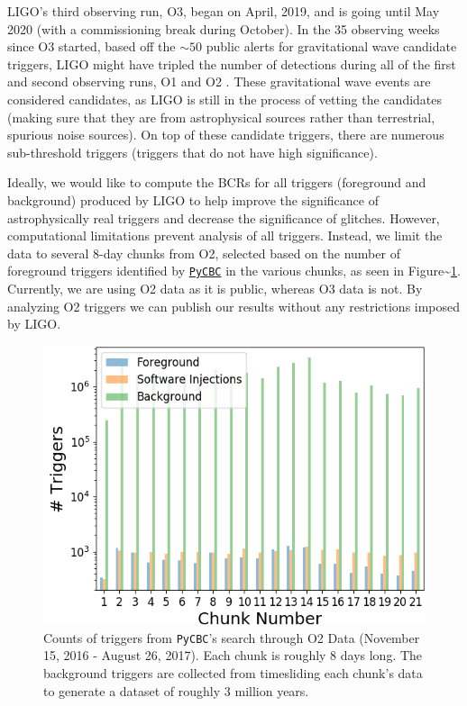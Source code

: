 \documentclass[%
 reprint,
 amsmath,amssymb,
 aps,
]{revtex4-2}
\begin{document}
LIGO's third observing run, O3, began on April, 2019, and is going until May 2020 (with a commissioning break during
October). In the 35 observing weeks since O3 started, based off the \(\sim50\) public alerts for gravitational wave
candidate triggers, LIGO might have tripled the number of detections during all of the first and second observing runs,
O1 and O2 \citep{gracedb}. These gravitational wave events are considered candidates, as LIGO is still in the process of vetting the
candidates (making sure that they are from astrophysical sources rather than terrestrial, spurious noise sources). On
top of these candidate triggers, there are numerous sub-threshold triggers (triggers that do not have high
significance).

Ideally, we would like to compute the BCRs for all triggers (foreground and background) produced by LIGO to help improve
the significance of astrophysically real triggers and decrease the significance of glitches. However, computational
limitations prevent analysis of all triggers. Instead, we limit the data to several 8-day chunks from O2, selected based
on the number of foreground triggers identified by \href{https://pycbc.org/}{\texttt{PyCBC}} in the various chunks, as seen in
Figure\textasciitilde\ref{fig:o2TrigCount}. Currently, we are using O2 data as it is public, whereas O3 data is not. By analyzing O2
triggers we can publish our results without any restrictions imposed by LIGO.



\begin{figure}[!h]

{\centering \includegraphics[width=0.75\linewidth]{images/O2_unfiltered_trigger_counts} 

}

\caption[Count of all triggers in PyCBC O2 search]{Counts of triggers from \texttt{PyCBC}'s search through O2 Data (November 15, 2016 - August 26, 2017). Each chunk is roughly 8 days long. The background triggers are collected from timesliding each chunk's data to generate a dataset of roughly 3 million years.}\label{fig:o2TrigCount}
\end{figure}
\end{document}
